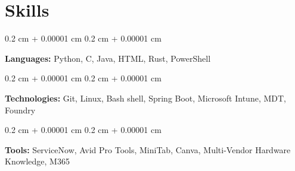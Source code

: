 \documentclass[10pt, letterpaper]{article}
\newenvironment{onecolentry}{
    \begin{adjustwidth}{
        0.2 cm + 0.00001 cm
    }{
        0.2 cm + 0.00001 cm
    }
}{
    \end{adjustwidth}
} %
\begin{document}
    \section{Skills}



        
        \begin{onecolentry}
            \textbf{Languages:} Python, C, Java, HTML, Rust, PowerShell \end{onecolentry}      
                \vspace{0.1 cm}
        \begin{onecolentry}
            \textbf{Technologies:} Git, Linux, Bash shell, Spring Boot, Microsoft Intune, MDT, Foundry \end{onecolentry}
                \vspace{0.1 cm}
        \begin{onecolentry}
            \textbf{Tools:} ServiceNow, Avid Pro Tools, MiniTab, Canva, Multi-Vendor Hardware Knowledge, M365 \end{onecolentry}
        \vspace{0.05 cm}


   




    
\end{document}
